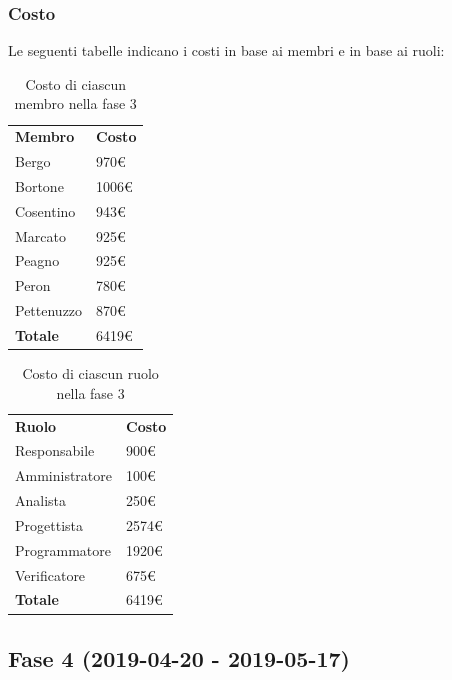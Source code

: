 	\subsubsection{Costo}
		Le seguenti tabelle indicano i costi in base ai membri e in base ai ruoli:
		\begin{table}[H]
			\centering
			\begin{tabular}{| l | l |}
				\rowcolor{LightBlue}
				\textbf{\color{white}Membro}
				& \textbf{\color{white}Costo}\\
				
				Bergo 				& 970€\\
				Bortone 			& 1006€\\
				Cosentino 		& 943€\\
				Marcato 			& 925€\\
				Peagno 			& 925€\\
				Peron 				& 780€\\
				Pettenuzzo 	& 870€\\ \hline
				\textbf{Totale} & 6419€\\ \hline
			\end{tabular}
			\caption{Costo di ciascun membro nella fase 3}
		\end{table}
		
		\begin{table}[H]
			\centering
			\begin{tabular}{| l | l |}
				\rowcolor{LightBlue}
				\textbf{\color{white}Ruolo}
				& \textbf{\color{white}Costo}\\
				
				Responsabile 		& 900€\\
				Amministratore 	& 100€\\
				Analista 				& 250€\\			
				Progettista 			& 2574€\\
				Programmatore 		& 1920€\\
				Verificatore 		& 675€\\ \hline
				\textbf{Totale} 	& 6419€\\ \hline
			\end{tabular}
			\caption{Costo di ciascun ruolo nella fase 3}
		\end{table}
		
\subsection{Fase 4 (2019-04-20 - 2019-05-17)}
